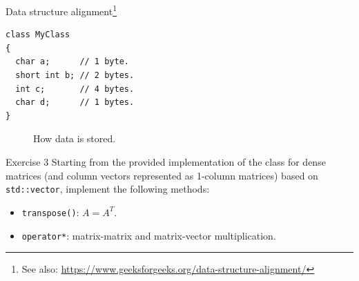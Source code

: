 \documentclass[10pt]{beamer}
\begin{document}
\begin{frame}[fragile]{Data structure alignment\footnote{See also: \url{https://www.geeksforgeeks.org/data-structure-alignment/}}}
    \begin{lstlisting}
class MyClass
{
  char a;      // 1 byte.
  short int b; // 2 bytes.
  int c;       // 4 bytes.
  char d;      // 1 bytes.
}
    \end{lstlisting}
    \begin{figure}
        \centering
        \caption{How data is  stored.}
    \end{figure}
\end{frame}


\begin{frame}{Exercise 3}
Starting from the provided implementation of the class for dense matrices (and column vectors represented as 1-column matrices) based on \lstinline{std::vector}, implement the following methods:
\begin{itemize}
\item \lstinline{transpose()}: $A = A^{T}$.
\item \lstinline{operator*}: matrix-matrix and matrix-vector multiplication.
\end{itemize}
\end{frame}
\end{document}
